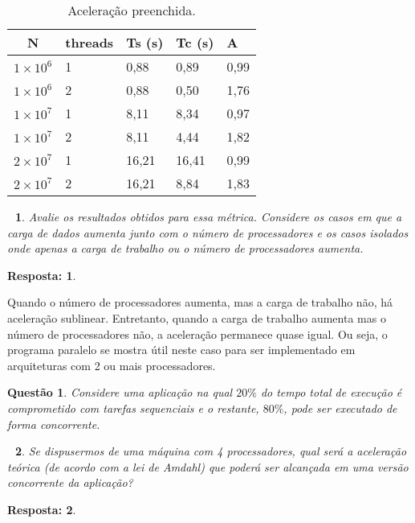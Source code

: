 \documentclass[a4paper, 12pt]{article}
\newtheorem{question}{Questão}
\newtheorem{questioni}{$\,\,$}[question]
\theoremstyle{dotless}
\newtheorem*{answer}{\textbf{Resposta:}}
\begin{document}
\begin{table}[h!]
    \centering
    \begin{tabular}{|c|l|l|l|l|}
        \hline
        N               & threads & Ts (s) & Tc (s) & A    \\
        \hline
        $1 \times 10^6$ & 1       & 0,88   & 0,89   & 0,99 \\
        \hline
        $1 \times 10^6$ & 2       & 0,88   & 0,50   & 1,76 \\
        \hline
        $1 \times 10^7$ & 1       & 8,11   & 8,34   & 0,97 \\
        \hline
        $1 \times 10^7$ & 2       & 8,11   & 4,44   & 1,82 \\
        \hline
        $2 \times 10^7$ & 1       & 16,21  & 16,41  & 0,99 \\
        \hline
        $2 \times 10^7$ & 2       & 16,21  & 8,84   & 1,83 \\
        \hline
    \end{tabular}
    \caption{Aceleração preenchida.}
\end{table}

\vspace*{0.5cm}

\begin{questioni}
    Avalie os resultados obtidos para essa métrica. Considere os casos em que a carga de dados aumenta junto com o número de processadores e os casos isolados onde apenas a carga de trabalho ou o número de processadores aumenta.
\end{questioni}
\begin{answer}
\end{answer}

Quando o número de processadores aumenta, mas a carga de trabalho não, há aceleração sublinear. Entretanto, quando a carga de trabalho aumenta mas o número de processadores não, a aceleração permanece quase igual. Ou seja, o programa paralelo se mostra útil neste caso para ser implementado em arquiteturas com 2 ou mais processadores.

\newpage

\begin{question}
    Considere uma aplicação na qual $20\%$ do tempo total de execução é comprometido com tarefas sequenciais e o restante, $80\%$, pode ser executado de forma concorrente.
\end{question}

\begin{questioni}
    Se dispusermos de uma máquina com 4 processadores, qual será a aceleração teórica (de acordo com a lei de Amdahl) que poderá ser alcançada em uma versão concorrente da aplicação?
\end{questioni}
\begin{answer}
\end{answer}
\end{document}
